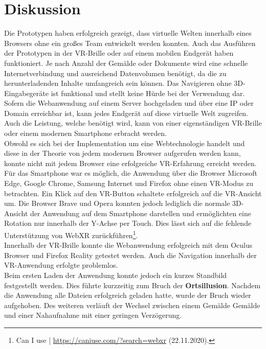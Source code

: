 \documentclass[a4paper,12pt,oneside]{article}
\begin{document}
  \section{Diskussion}
    Die Prototypen haben erfolgreich gezeigt, dass virtuelle Welten innerhalb
    eines Browsers ohne ein großes Team entwickelt werden konnten. Auch das
    Ausführen der Prototypen in der VR-Brille oder auf einem mobilen Endgerät 
    haben funktioniert. Je nach Anzahl der Gemälde oder Dokumente wird
    eine schnelle Internetverbindung und ausreichend Datenvolumen benötigt,
    da die zu herunterladenden Inhalte umfangreich sein können. Das
    Navigieren ohne 3D-Eingabegeräte ist funktional und stellt keine Hürde
    bei der Verwendung dar.
    Sofern die Webanwendung auf einem Server hochgeladen und über eine IP
    oder Domain erreichbar ist, kann jedes Endgerät 
    auf diese virtuelle Welt zugreifen.
    Auch die Leistung, welche benötigt wird, kann von einer eigenständigen
    VR-Brille oder einem modernen Smartphone erbracht werden. \\
    Obwohl es sich bei der Implementation um eine Webtechnologie handelt
    und diese in der Theorie von jedem modernen Browser aufgerufen werden
    kann, konnte nicht mit jedem Browser eine erfolgreiche VR-Erfahrung
    erreicht werden. Für das Smartphone war es möglich, 
    die Anwendung über die Browser
    Microsoft Edge, Google Chrome, Samsung
    Internet und Firefox ohne einen VR-Modus zu betrachten. 
    Ein Klick auf den VR-Button schaltete erfolgreich
    auf die VR-Ansicht um. 
    Die Browser Brave und Opera konnten jedoch lediglich 
    die normale 3D-Ansicht der Anwendung auf dem Smartphone darstellen
    und ermöglichten eine Rotation nur innerhalb der Y-Achse per Touch.
    Dies lässt sich auf die fehlende Unterstützung von WebXR zurückführen\footnote{Can I use | \url{https://caniuse.com/?search=webxr} (22.11.2020).}. \\
    Innerhalb der VR-Brille konnte die Webanwendung erfolgreich mit dem
    Oculus Browser und Firefox Reality getestet werden. Auch die Navigation
    innerhalb der VR-Anwendung erfolgte problemlos. \\
    Beim ersten Laden der
    Anwendung konnte jedoch ein kurzes Standbild festgestellt werden. Dies 
    führte kurzzeitig zum Bruch der \textbf{Ortsillusion}. Nachdem 
    die Anwendung alle Dateien erfolgreich geladen hatte, wurde der Bruch
    wieder aufgehoben.
    Des weiteren verläuft der Wechsel zwischen einem Gemälde Gemälde 
    und einer Nahaufnahme mit einer geringen Verzögerung.
\end{document}
